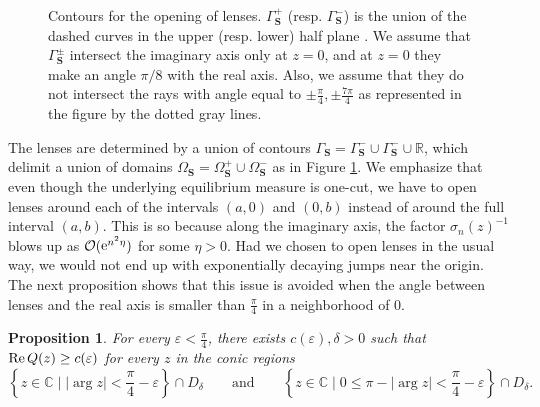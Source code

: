 \documentclass[reqno,a4paper,11pt]{amsart}
\DeclareMathOperator{\ee}{\rm e}
\renewcommand{\Re}{\mathop{\rm Re}}
\newcommand{\C}{\mathbb{C}}
\newcommand{\R}{\mathbb{R}}
\newcommand{\Boh}{\mathcal{O}}
\renewcommand{\bm}{\mathbf}
\newtheorem{prop}[theorem]{Proposition}
\theoremstyle{definition}
\theoremstyle{remark}
\numberwithin{equation}{section}
\begin{document}
\begin{figure}[t]
         \caption{Contours for the opening of lenses. $\Gamma_{\bm S}^+$ (resp. $\Gamma_{\bm S}^-$) is the union of the dashed curves in the upper (resp. lower) half plane . We assume that $\Gamma_{\bm S}^\pm$ intersect the imaginary axis only at $z=0$, and at $z=0$ they make an angle $\pi/8$ with the real axis. Also, we assume that they do not intersect the rays with angle equal to $ \pm \frac{ \pi}{4}, \pm \frac{7 \pi}{4}$ as represented in the figure by the dotted gray lines. }
        \label{fig:Opening_of_Lenses}
    \end{figure}
        
        
        The lenses are determined by a union of contours $\Gamma_{\bm S} = \Gamma_{\bm S}^- \cup \Gamma_{\bm S}^- \cup \R$, which delimit a union of domains  $\Omega_{\bm S} = \Omega_{\bm S}^+ \cup \Omega_{\bm S}^-$ as in Figure \ref{fig:Opening_of_Lenses}. We emphasize that even though the underlying equilibrium measure is one-cut, we have to open lenses around each of the intervals $(a,0)$ and $(0,b)$ instead of around the full interval $(a,b)$. This is so because along the imaginary axis, the factor $\sigma_n(z)^{-1}$ blows up as $\Boh(\ee^{n^2\eta})$ for some $\eta>0$. Had we chosen to open lenses in the usual way, we would not end up with exponentially decaying jumps near the origin. The next proposition shows that this issue is avoided when the angle between lenses and the real axis is smaller than $\frac{\pi}{4}$ in a neighborhood of $0$.
        
\begin{prop}
\label{prop:polefreeregions}
For every $\varepsilon < \frac{\pi}{4}$, there exists $c(\varepsilon),\delta > 0$ such that $\Re Q(z) \geq c(\varepsilon)$ for every $z$ in the conic regions
%
$$
\left\{z\in \C \mid |\arg z|<\frac{\pi}{4}-\varepsilon\right\}\cap D_\delta\qquad \text{and}\qquad \left\{z\in \C \mid 0\leq \pi -|\arg z|<\frac{\pi}{4}-\varepsilon\right\}\cap D_\delta.
$$
%
\end{prop}  
\end{document}
